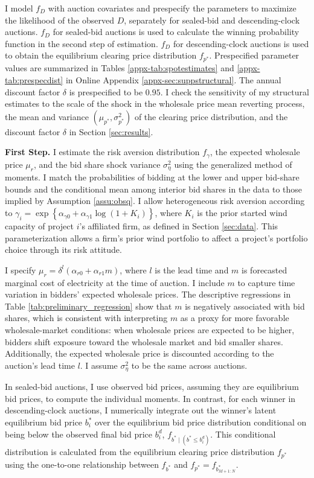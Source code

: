 \documentclass[12pt]{article}
\theoremstyle{definition} %
\begin{document}
I model $f_D $ with auction covariates and prespecify the parameters to maximize the likelihood of the observed $D$, separately for sealed-bid and descending-clock auctions. $f_D $ for sealed-bid auctions is used to calculate the winning probability function in the second step of estimation. $f_D $ for descending-clock auctions is used to obtain the equilibrium clearing price distribution $f_{p^\ast} $. Prespecified parameter values are summarized in Tables \ref{appx-tab:spotestimates} and \ref{appx-tab:prespecdist} in Online Appendix \ref{appx-sec:suppstructural}. The annual discount factor $\delta$ is prespecified to be $0.95 $. I check the sensitivity of my structural estimates to the scale of the shock in the wholesale price mean reverting process, the mean and variance $(\mu_{p^\ast},\sigma_{p^\ast}^2)$ of the clearing price distribution, and the discount factor $\delta$ in Section \ref{sec:results}.

\textbf{First Step.} I estimate the risk aversion distribution $f_\gamma$, the expected wholesale price $\mu_r$, and the bid share shock variance $\sigma_\eta^2$ using the generalized method of moments. I match the probabilities of bidding at the lower and upper bid-share bounds and the conditional mean among interior bid shares in the data to those implied by Assumption \ref{assu:obsq}. I allow heterogeneous risk aversion according to $\gamma_i = \exp\left\{\alpha_{\gamma 0} + \alpha_{\gamma 1}\log(1+K_i)\right\}$, where $K_i$ is the prior started wind capacity of project $i$'s affiliated firm, as defined in Section \ref{sec:data}. This parameterization allows a firm's prior wind portfolio to affect a project's portfolio choice through its risk attitude.

I specify $\mu_r = \delta^{l} (\alpha_{r 0} + \alpha_{r 1} m) $, where $l$ is the lead time and $m$ is forecasted marginal cost of electricity at the time of auction. I include $m$ to capture time variation in bidders' expected wholesale prices. The descriptive regressions in Table \ref{tab:preliminary_regression} show that $m$ is negatively associated with bid shares, which is consistent with interpreting $m$ as a proxy for more favorable wholesale-market conditions: when wholesale prices are expected to be higher, bidders shift exposure toward the wholesale market and bid smaller shares. Additionally, the expected wholesale price is discounted according to the auction's lead time $l$. I assume $\sigma_\eta^2 $ to be the same across auctions.

In sealed-bid auctions, I use observed bid prices, assuming they are equilibrium bid prices, to compute the individual moments. In contrast, for each winner in descending-clock auctions, I numerically integrate out the winner's latent equilibrium bid price $b_i^\ast$ over the equilibrium bid price distribution conditional on being below the observed final bid price $b_i^d$, $f_{b^\ast \mid (b^\ast \leq b_i^d)}$. This conditional distribution is calculated from the equilibrium clearing price distribution $f_{p^\ast}$ using the one-to-one relationship between $f_{b^\ast}$ and $f_{p^\ast} = f_{b_{M + 1:N}^\ast}$.
\end{document}
